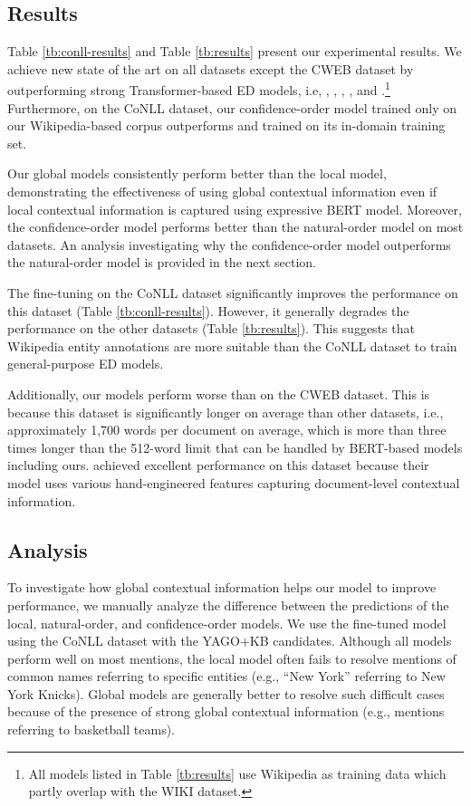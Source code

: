 \documentclass[11pt]{article}
\begin{document}
\subsection{Results}
Table \ref{tb:conll-results} and Table \ref{tb:results} present our experimental results.
We achieve new state of the art on all datasets except the CWEB dataset by outperforming strong Transformer-based ED models, i.e, , , , , and .\footnote{All models listed in Table \ref{tb:results} use Wikipedia as training data which partly overlap with the WIKI dataset.}
Furthermore, on the CoNLL dataset, our confidence-order model trained only on our Wikipedia-based corpus outperforms  and  trained on its in-domain training set.

Our global models consistently perform better than the local model, demonstrating the effectiveness of using global contextual information even if local contextual information is captured using expressive BERT model.
Moreover, the confidence-order model performs better than the natural-order model on most datasets.
An analysis investigating why the confidence-order model outperforms the natural-order model is provided in the next section.

The fine-tuning on the CoNLL dataset significantly improves the performance on this dataset (Table \ref{tb:conll-results}).
However, it generally degrades the performance on the other datasets (Table \ref{tb:results}).
This suggests that Wikipedia entity annotations are more suitable than the CoNLL dataset to train general-purpose ED models.

Additionally, our models perform worse than  on the CWEB dataset.
This is because this dataset is significantly longer on average than other datasets, i.e., approximately 1,700 words per document on average, which is more than three times longer than the 512-word limit that can be handled by BERT-based models including ours.
 achieved excellent performance on this dataset because their model uses various hand-engineered features capturing document-level contextual information.

\subsection{Analysis}
To investigate how global contextual information helps our model to improve performance, we manually analyze the difference between the predictions of the local, natural-order, and confidence-order models.
We use the fine-tuned model using the CoNLL dataset with the YAGO+KB candidates.
Although all models perform well on most mentions, the local model often fails to resolve mentions of common names referring to specific entities (e.g., ``New York'' referring to New York Knicks).
Global models are generally better to resolve such difficult cases because of the presence of strong global contextual information (e.g., mentions referring to basketball teams).
\end{document}
